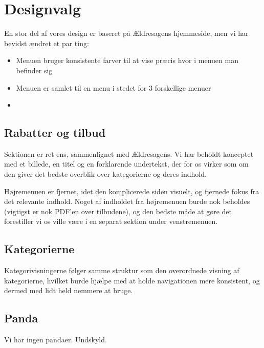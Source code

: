 \section{Designvalg}
En stor del af vores design er baseret på Ældresagens hjemmeside, men vi har
bevidst ændret et par ting:

\begin{itemize}
\item Menuen bruger konsistente farver til at vise præcis hvor i menuen man befinder sig
\item Menuen er samlet til en menu i stedet for 3 forskellige menuer
\item 
\end{itemize}

\subsection{Rabatter og tilbud}
Sektionen er ret ens, sammenlignet med Ældresagens. Vi har beholdt konceptet med et billede, en titel og en forklarende undertekst, der for os virker som om den giver det bedste overblik over kategorierne og deres indhold.

Højremenuen er fjernet, idet den komplicerede siden visuelt, og fjernede fokus fra det relevante indhold.
Noget af indholdet fra højremenuen burde nok beholdes (vigtigst er nok PDF'en over tilbudene), og den bedste måde at gøre det forestiller vi os ville være i en separat sektion under venstremenuen. 

\subsection{Kategorierne}
Kategorivisningerne følger samme struktur som den overordnede visning af kategorierne, hvilket burde hjælpe med at holde navigationen mere konsistent, og dermed med lidt held nemmere at bruge. 

\subsection{Panda}
Vi har ingen pandaer. Undskyld.
